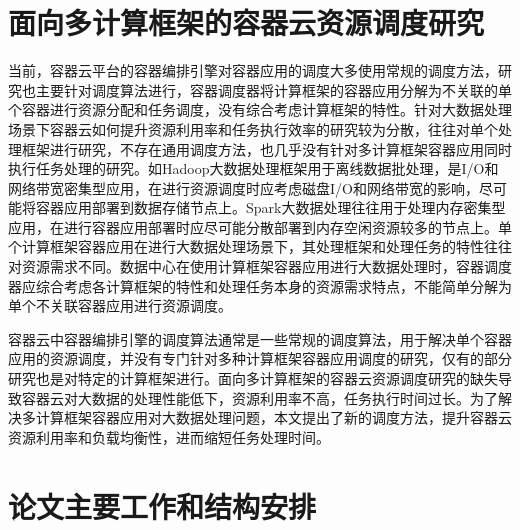 \section{面向多计算框架的容器云资源调度研究}
当前，容器云平台的容器编排引擎对容器应用的调度大多使用常规的调度方法，研究也主要针对调度算法进行，容器调度器将计算框架的容器应用分解为不关联的单个容器进行资源分配和任务调度，没有综合考虑计算框架的特性。针对大数据处理场景下容器云如何提升资源利用率和任务执行效率的研究较为分散，往往对单个处理框架进行研究，不存在通用调度方法，也几乎没有针对多计算框架容器应用同时执行任务处理的研究。如Hadoop大数据处理框架用于离线数据批处理，是I/O和网络带宽密集型应用，在进行资源调度时应考虑磁盘I/O和网络带宽的影响，尽可能将容器应用部署到数据存储节点上。Spark大数据处理往往用于处理内存密集型应用，在进行容器应用部署时应尽可能分散部署到内存空闲资源较多的节点上。单个计算框架容器应用在进行大数据处理场景下，其处理框架和处理任务的特性往往对资源需求不同。数据中心在使用计算框架容器应用进行大数据处理时，容器调度器应综合考虑各计算框架的特性和处理任务本身的资源需求特点，不能简单分解为单个不关联容器应用进行资源调度。

容器云中容器编排引擎的调度算法通常是一些常规的调度算法，用于解决单个容器应用的资源调度，并没有专门针对多种计算框架容器应用调度的研究，仅有的部分研究也是对特定的计算框架进行。面向多计算框架的容器云资源调度研究的缺失导致容器云对大数据的处理性能低下，资源利用率不高，任务执行时间过长。为了解决多计算框架容器应用对大数据处理问题，本文提出了新的调度方法，提升容器云资源利用率和负载均衡性，进而缩短任务处理时间。

\section{论文主要工作和结构安排}
